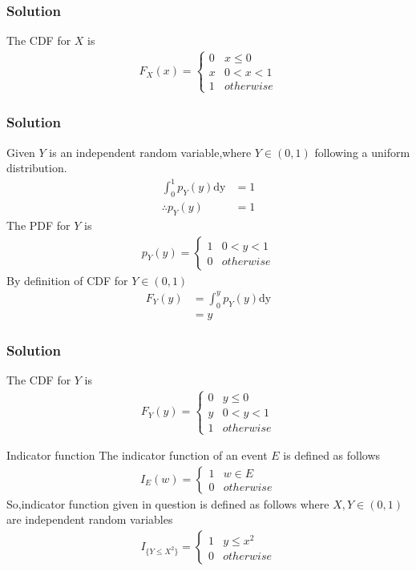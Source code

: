 \documentclass{beamer}
\begin{document}
\begin{frame}
\frametitle{Solution}
The CDF for $X$ is
\begin{align}
F_{X}(x)  = 
\begin{cases}
      0 & x \leq 0 \\
      x & 0 < x < 1 \\
      1 & otherwise
\end{cases}  \label{2}
\end{align}
\end{frame}
\begin{frame}
\frametitle{Solution}
Given $Y$ is an independent random variable,where $Y \in (0,1)$ following a uniform distribution.\\
\begin{align}
\int_{0}^{1} p_Y(y) \mathrm{dy} &=1  \\
\therefore p_Y(y)&=1 \label{py}
\end{align}
The PDF for $Y$ is
\begin{align}
p_{Y}(y)  = 
\begin{cases}
      1 & 0 < y < 1 \\
      0 & otherwise 
\end{cases} \label{3}
\end{align}
By definition of CDF for $Y \in (0,1)$
\begin{align}
F_Y(y)&=\int_{0}^{y} p_Y(y) \mathrm{dy} \\
      &=y
\end{align}
\end{frame}
\begin{frame}
\frametitle{Solution}
The CDF for $Y$ is
\begin{align}
F_{Y}(y)  = 
\begin{cases}
      0 & y \leq 0 \\
      y & 0 < y < 1 \\
      1 & otherwise 
\end{cases}\label{4}
\end{align}
\end{frame}
\begin{frame}
\begin{block}{Indicator function}
The indicator function of an event $E$ is defined as follows
\begin{align} 
I_{E}(w) =
\begin{cases}
    1 & w \in E \\
    0 & otherwise 
\end{cases} \label{5}
\end{align}
So,indicator function given in question is defined as follows where $X,Y \in (0,1)$ are independent random variables
\begin{align} 
I_{\{Y\leq X^2\}} =
\begin{cases}
    1 & y \leq x^2  \\
    0 & otherwise 
\end{cases} \label{6}
\end{align}
\end{block}
\end{frame}
\end{document}
